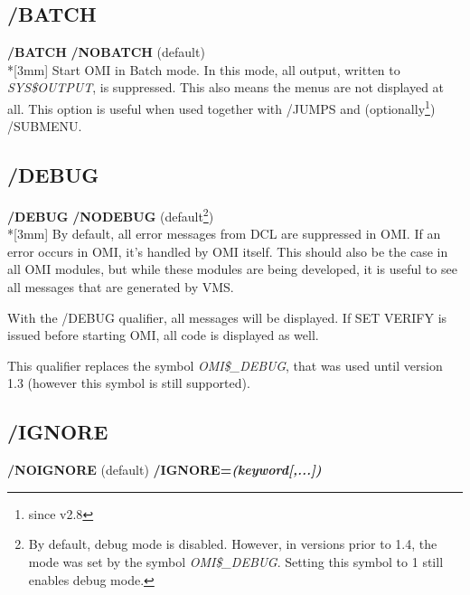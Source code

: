 \documentclass[a4paper]{book}
\newcommand{\vs}{\vspace{3mm}}
\renewcommand{\indent}{\hspace*{5mm}}
\begin{document}
\subsection{/BATCH}
\label{subsubsec:mylabel3}

\vs

\indent\textbf{/BATCH} \newline
\indent\textbf{/NOBATCH} (default)\\*[3mm]
Start OMI in Batch mode. In this mode, all output, written to \textsl{SYS{\$}OUTPUT}, 
is suppressed. This also means the menus are not displayed at all. This 
option is useful when used together with \textsf{/JUMPS} and (optionally\footnote{ since v2.8}) \textsf{/SUBMENU}.

\subsection{/DEBUG}
\label{subsubsec:mylabel4}

\indent\textbf{/DEBUG} \newline
\indent\textbf{/NODEBUG} (default\footnote{ By default, debug mode is disabled. 
However, in versions prior to 1.4, the mode was set by the symbol 
\textsl{OMI{\$}{\_}DEBUG}. Setting this symbol to 1 still enables debug mode.\par})\\*[3mm]
By default, all error messages from DCL are suppressed in OMI. If an error 
occurs in OMI, it's handled by OMI itself. This should also be the case in 
all OMI modules, but while these modules are being developed, it is useful 
to see all messages that are generated by VMS.

With the /DEBUG qualifier, all messages will be displayed. If \textsf{SET VERIFY}
is issued before starting OMI, all code is displayed as well.

\vs

This qualifier replaces the symbol \textsl{OMI{\$}{\_}DEBUG}, that was used until 
version 1.3 (however this symbol is still supported).

\subsection{/IGNORE}
\label{subsubsec:ignore}
\indent\textbf{/NOIGNORE} (default)\newline
\indent\textbf{/IGNORE=\textit{(keyword[,...])}}
\end{document}
